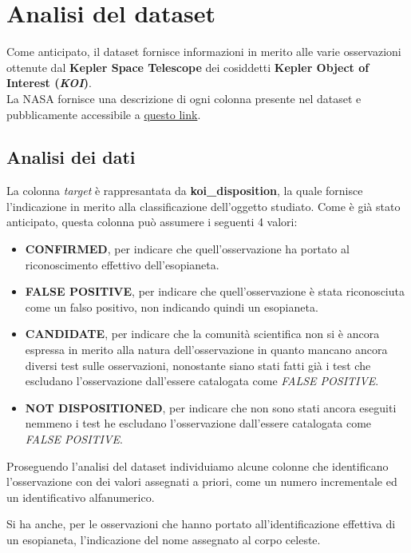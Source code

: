 \chapter{Analisi del dataset}
Come anticipato, il dataset fornisce informazioni in merito alle varie 
osservazioni ottenute dal \textbf{Kepler Space Telescope} dei cosiddetti
\textbf{Kepler Object of Interest (\textit{KOI})}.\\

La NASA fornisce una descrizione di ogni colonna presente nel dataset e 
pubblicamente accessibile a 
\href{https://exoplanetarchive.ipac.caltech.edu/docs/API_kepcandidate_columns.html}{questo link}.

\section{Analisi dei dati}

La colonna \textit{target} è rappresantata da \textbf{koi\_disposition}, la quale 
fornisce l'indicazione in merito alla classificazione dell'oggetto studiato.
Come è già stato anticipato, questa colonna può assumere i seguenti 4 valori: 
\begin{itemize}
    \item \textbf{CONFIRMED}, per indicare che quell'osservazione ha portato al 
    riconoscimento effettivo dell'esopianeta.
    \item \textbf{FALSE POSITIVE}, per indicare che quell'osservazione è stata 
    riconosciuta come un falso positivo, non indicando quindi un esopianeta.
    \item \textbf{CANDIDATE}, per indicare che la comunità scientifica non si 
    è ancora espressa in merito alla natura dell'osservazione in quanto mancano
    ancora diversi test sulle osservazioni, nonostante siano stati fatti già
    i test che escludano l'osservazione dall'essere catalogata come 
    \textit{FALSE POSITIVE}.
    \item \textbf{NOT DISPOSITIONED}, per indicare che non sono stati ancora 
    eseguiti nemmeno i test he escludano l'osservazione dall'essere catalogata 
    come \textit{FALSE POSITIVE}.
\end{itemize}

Proseguendo l'analisi del dataset individuiamo alcune colonne 
che identificano l'osservazione con dei valori assegnati a priori,
come un numero incrementale ed un identificativo alfanumerico.

Si ha anche, per le osservazioni che hanno portato all'identificazione effettiva di un 
esopianeta, l'indicazione del nome assegnato al corpo celeste. 

